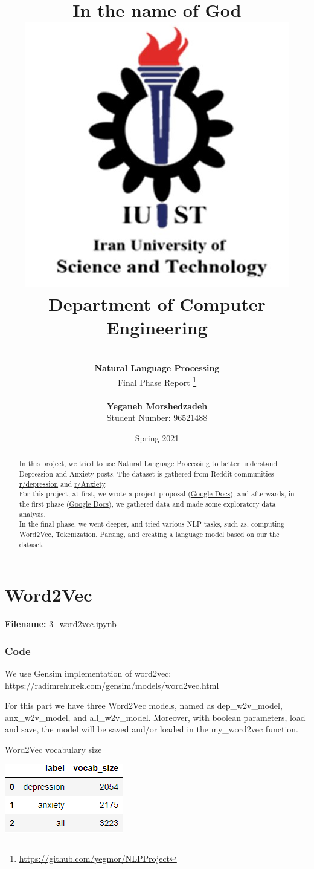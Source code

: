 \documentclass[12pt, a4paper]{article}
\title{
	{\Huge \textbf{In the name of God}}
	\\[20pt]
	\includegraphics[width=0.5\linewidth]{../assets/IUST_logo_color_eng.jpg} \\
	{\normalsize Department of Computer Engineering}
}
\author{
	\\[10pt]
	\textbf{{\LARGE Natural Language Processing}}
	\\[10pt]
	\LARGE Final Phase Report
	\thanks{\url{https://github.com/yegmor/NLPProject}}
	
	\\[30pt]
	\textbf{Yeganeh Morshedzadeh}
	\\[5pt]
	Student Number: 96521488
}
\date{Spring 2021}
\begin{document}
	
\maketitle
	
\clearpage
\tableofcontents
\newpage

\listoffigures
\newpage

\listoftables
\newpage

\begin{abstract}
	In this project, we tried to use Natural Language Processing to better understand Depression and Anxiety posts. The dataset is gathered from Reddit communities \href{https://www.reddit.com/r/depression}{r/depression} and \href{https://www.reddit.com/r/Anxiety}{r/Anxiety}.
	\\[10pt]
	
	For this project, at first, we wrote a project proposal (\href{https://docs.google.com/document/d/1tHGEmEgn8-sp8MD72d8NjnZsq-GpVupzsMWgnqaGi-Y/edit?usp=sharing}{Google Docs}), and afterwards, in the first phase (\href{https://docs.google.com/document/d/1Jc2ELhweU01Tbf0WalU7wVQABdAV4w50mhQnmMpU2mM/edit?usp=sharing}{Google Docs}), we gathered data and made some exploratory data analysis. 
	\\[10pt]
	
	In the final phase, we went deeper, and tried various NLP tasks, such as, computing Word2Vec, Tokenization, Parsing, and creating a language model based on our the dataset.
\end{abstract}

\newpage
\part{Word2Vec}
\large{\textbf{Filename:} 3\_word2vec.ipynb}

\section*{Code}
We use Gensim implementation of word2vec: https://radimrehurek.com/gensim/models/word2vec.html

For this part we have three Word2Vec models, named as dep\_w2v\_model, anx\_w2v\_model, and all\_w2v\_model. Moreover, with boolean parameters, load and save, the model will be saved and/or loaded in the my\_word2vec function.

\begin{table}[H]
	\caption{Word2Vec vocabulary size} 
	\centering 
	\vspace{5mm} 
	\includegraphics[width=0.5\linewidth]{../reports/images/w2v_vocab-size.png}
	\label{table:w2v_vocab-size} 
\end{table}
\end{document}
